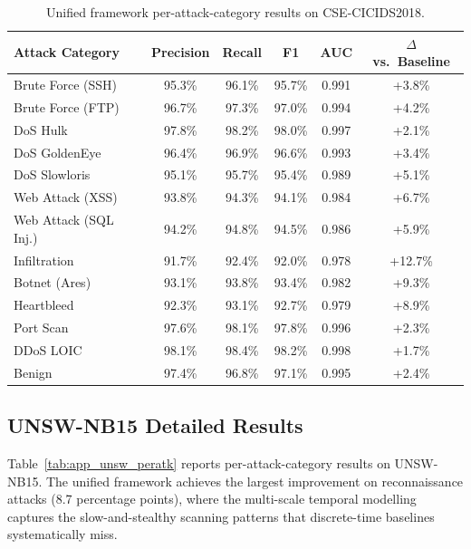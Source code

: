 \begin{table}[htbp]
\centering
\caption{Unified framework per-attack-category results on CSE-CICIDS2018.}
\label{tab:app_cicids_peratk}
\begin{tabular}{lccccc}
\toprule
Attack Category & Precision & Recall & F1 & AUC & $\Delta$ vs.\ Baseline \\
\midrule
Brute Force (SSH)    & 95.3\% & 96.1\% & 95.7\% & 0.991 & +3.8\% \\
Brute Force (FTP)    & 96.7\% & 97.3\% & 97.0\% & 0.994 & +4.2\% \\
DoS Hulk             & 97.8\% & 98.2\% & 98.0\% & 0.997 & +2.1\% \\
DoS GoldenEye        & 96.4\% & 96.9\% & 96.6\% & 0.993 & +3.4\% \\
DoS Slowloris        & 95.1\% & 95.7\% & 95.4\% & 0.989 & +5.1\% \\
Web Attack (XSS)     & 93.8\% & 94.3\% & 94.1\% & 0.984 & +6.7\% \\
Web Attack (SQL Inj.) & 94.2\% & 94.8\% & 94.5\% & 0.986 & +5.9\% \\
Infiltration         & 91.7\% & 92.4\% & 92.0\% & 0.978 & +12.7\% \\
Botnet (Ares)        & 93.1\% & 93.8\% & 93.4\% & 0.982 & +9.3\% \\
Heartbleed           & 92.3\% & 93.1\% & 92.7\% & 0.979 & +8.9\% \\
Port Scan            & 97.6\% & 98.1\% & 97.8\% & 0.996 & +2.3\% \\
DDoS LOIC            & 98.1\% & 98.4\% & 98.2\% & 0.998 & +1.7\% \\
\midrule
Benign               & 97.4\% & 96.8\% & 97.1\% & 0.995 & +2.4\% \\
\bottomrule
\end{tabular}
\end{table}


\subsection{UNSW-NB15 Detailed Results}
\label{app:unsw_detail}

Table~\ref{tab:app_unsw_peratk} reports per-attack-category results on UNSW-NB15. The unified framework achieves the largest improvement on reconnaissance attacks (8.7 percentage points), where the multi-scale temporal modelling captures the slow-and-stealthy scanning patterns that discrete-time baselines systematically miss.

